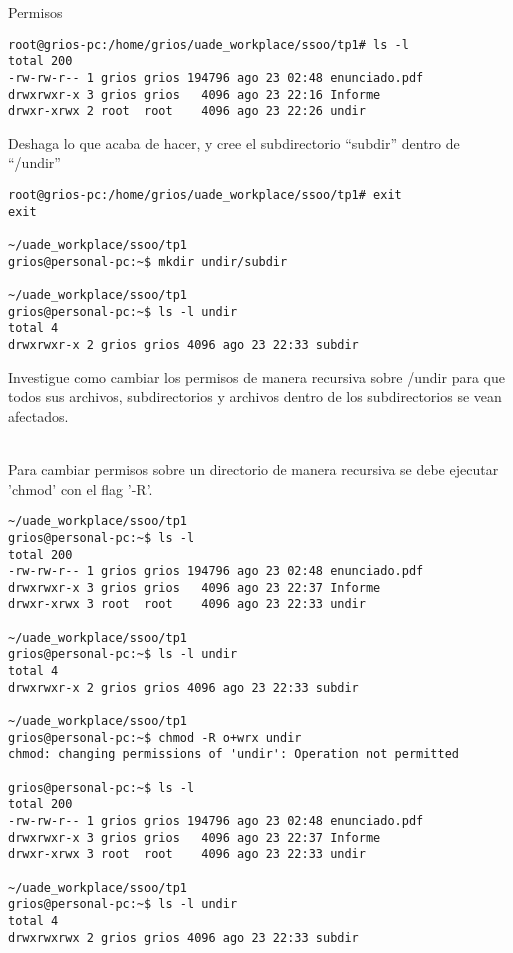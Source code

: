 \begin{section}{Permisos}
\begin{lstlisting}[style=Ubuntu]
root@grios-pc:/home/grios/uade_workplace/ssoo/tp1# ls -l
total 200
-rw-rw-r-- 1 grios grios 194796 ago 23 02:48 enunciado.pdf
drwxrwxr-x 3 grios grios   4096 ago 23 22:16 Informe
drwxr-xrwx 2 root  root    4096 ago 23 22:26 undir
\end{lstlisting}

\begin{quoting}
Deshaga lo que acaba de hacer, y cree el subdirectorio “subdir” dentro de “/undir”
\end{quoting}
\begin{lstlisting}[style=Ubuntu]
root@grios-pc:/home/grios/uade_workplace/ssoo/tp1# exit
exit

~/uade_workplace/ssoo/tp1
grios@personal-pc:~$ mkdir undir/subdir

~/uade_workplace/ssoo/tp1
grios@personal-pc:~$ ls -l undir 
total 4
drwxrwxr-x 2 grios grios 4096 ago 23 22:33 subdir
\end{lstlisting}

\begin{quoting}
Investigue como cambiar los permisos de manera recursiva sobre /undir para que todos sus
archivos, subdirectorios y archivos dentro de los subdirectorios se vean afectados.
\end{quoting}\\
Para cambiar permisos sobre un directorio de manera recursiva se debe ejecutar 'chmod' con el flag '-R'.

\begin{lstlisting}[style=Ubuntu]
~/uade_workplace/ssoo/tp1
grios@personal-pc:~$ ls -l
total 200
-rw-rw-r-- 1 grios grios 194796 ago 23 02:48 enunciado.pdf
drwxrwxr-x 3 grios grios   4096 ago 23 22:37 Informe
drwxr-xrwx 3 root  root    4096 ago 23 22:33 undir

~/uade_workplace/ssoo/tp1
grios@personal-pc:~$ ls -l undir
total 4
drwxrwxr-x 2 grios grios 4096 ago 23 22:33 subdir

~/uade_workplace/ssoo/tp1
grios@personal-pc:~$ chmod -R o+wrx undir
chmod: changing permissions of 'undir': Operation not permitted

grios@personal-pc:~$ ls -l
total 200
-rw-rw-r-- 1 grios grios 194796 ago 23 02:48 enunciado.pdf
drwxrwxr-x 3 grios grios   4096 ago 23 22:37 Informe
drwxr-xrwx 3 root  root    4096 ago 23 22:33 undir

~/uade_workplace/ssoo/tp1
grios@personal-pc:~$ ls -l undir
total 4
drwxrwxrwx 2 grios grios 4096 ago 23 22:33 subdir

\end{lstlisting}

\end{section}